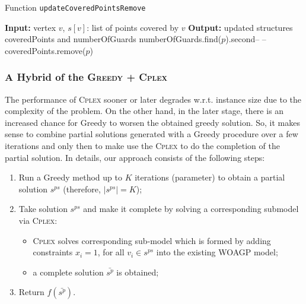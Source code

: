 \documentclass[runningheads,a4paper]{elsarticle}
\begin{document}

            \begin{algorithm}[!t]
          	\caption{Function \texttt{updateCoveredPointsRemove}}\label{alg:updateCoveredPointsRemove}
          	\begin{algorithmic}[1]
          		\State \textbf{Input:} vertex $v$, $s[v]$:  list of points covered by $v$
          		\State \textbf{Output:} updated structures coveredPoints and numberOfGuards
          		\State numberOfGuards.find($p$).second-- --
                    \State coveredPoints.remove($p$)
                    \EndIf
          		\EndFor
          	\end{algorithmic}
          \end{algorithm}
\subsubsection{A Hybrid of the \textsc{Greedy + \textsc{Cplex}}}
	The performance of \textsc{Cplex}  sooner or later degrades w.r.t. instance size due to the complexity of the problem. On the other hand, in the later stage, there is an increased chance for Greedy to worsen the obtained greedy solution. So, it makes sense to combine  partial solutions generated with a Greedy procedure over a few iterations  and only then to make use the \textsc{Cplex} to do the completion of the partial solution. In details, our approach consists of the following steps:
	\begin{enumerate}
		\item Run a Greedy method up to $K$ iterations (parameter) to obtain a partial solution $s^{ps}$ (therefore, $|s^{ps}| = K$);
		\item Take solution $s^{ps}$ and make it complete by solving a corresponding submodel via \textsc{Cplex}:
		\begin{itemize}
			\item \textsc{Cplex} solves corresponding sub-model which is formed by adding constraints $x_{i} = 1$, for all $v_i \in s^{ps}$ into the existing WOAGP model;
			\item a complete solution $\bar {s^p}$ is obtained;
		\end{itemize}
		\item Return $f(\bar {s^p})$.
	\end{enumerate}
 
\end{document}
